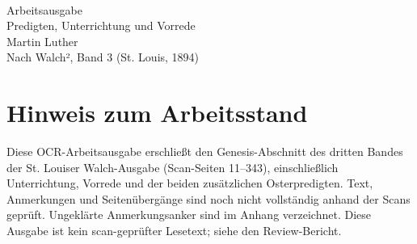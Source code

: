 \documentclass{oll-book}
\begin{document}
\frontmatter
\begin{titelseite}
\\[1em]
Arbeitsausgabe\\[1em]
Predigten, Unterrichtung und Vorrede\\[1em]
Martin Luther\\[1em]
Nach Walch², Band 3 (St. Louis, 1894)
\end{titelseite}
\chapter{Hinweis zum Arbeitsstand}
Diese OCR-Arbeitsausgabe erschließt den Genesis-Abschnitt des dritten
Bandes der St. Louiser Walch-Ausgabe (Scan-Seiten 11–343), einschließlich
Unterrichtung, Vorrede und der beiden zusätzlichen Osterpredigten.
Text, Anmerkungen und Seitenübergänge sind noch nicht vollständig anhand
der Scans geprüft. Ungeklärte Anmerkungsanker sind im Anhang verzeichnet.
Diese Ausgabe ist kein scan-geprüfter Lesetext; siehe den Review-Bericht.
\tableofcontents
\mainmatter

\end{document}
